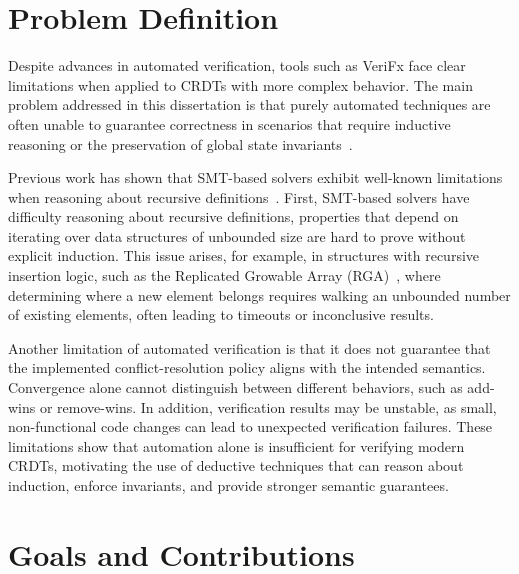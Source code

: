 \section{Problem Definition}
\label{sec:problem}


Despite advances in automated verification, tools such as VeriFx face clear limitations when applied to CRDTs with more complex behavior. The main problem addressed in this dissertation is that purely automated techniques are often unable to guarantee correctness in scenarios that require inductive reasoning or the preservation of global state invariants~\cite{dina2022thesis}.

Previous work has shown that SMT-based solvers exhibit well-known limitations when reasoning about recursive definitions~\cite{why3}. First, SMT-based solvers have difficulty reasoning about recursive definitions, properties that depend on iterating over data structures of unbounded size are hard to prove without explicit induction. This issue arises, for example, in structures with recursive insertion logic, such as the Replicated Growable Array (RGA)~\cite{roh2011rga}, where determining where a new element belongs requires walking an unbounded number of existing elements, often leading to timeouts or inconclusive results.

Another limitation of automated verification is that it does not guarantee that the implemented conflict-resolution policy aligns with the intended semantics. Convergence alone cannot distinguish between different behaviors, such as add-wins or remove-wins. In addition, verification results may be unstable, as small, non-functional code changes can lead to unexpected verification failures. These limitations show that automation alone is insufficient for verifying modern CRDTs, motivating the use of deductive techniques that can reason about induction, enforce invariants, and provide stronger semantic guarantees.

\section{Goals and Contributions}
\label{sec:contributions}


